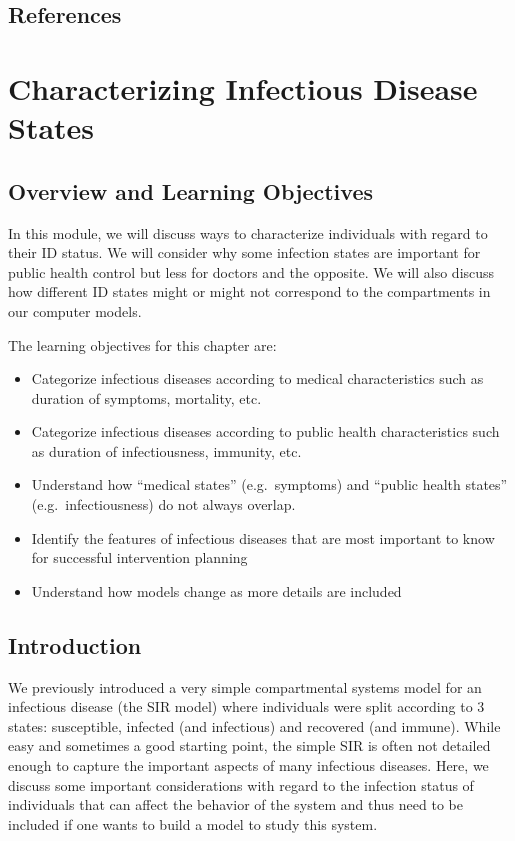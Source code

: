 \documentclass[]{book}
\providecommand{\tightlist}{%
  \setlength{\itemsep}{0pt}\setlength{\parskip}{0pt}}
\theoremstyle{definition}
\theoremstyle{definition}
\theoremstyle{definition}
\theoremstyle{remark}
\begin{document}
\section{References}\label{references-1}

\chapter{Characterizing Infectious Disease
States}\label{characterizing-infectious-disease-states}

\section{Overview and Learning
Objectives}\label{overview-and-learning-objectives-1}

In this module, we will discuss ways to characterize individuals with
regard to their ID status. We will consider why some infection states
are important for public health control but less for doctors and the
opposite. We will also discuss how different ID states might or might
not correspond to the compartments in our computer models.

The learning objectives for this chapter are:

\begin{itemize}
\tightlist
\item
  Categorize infectious diseases according to medical characteristics
  such as duration of symptoms, mortality, etc.
\item
  Categorize infectious diseases according to public health
  characteristics such as duration of infectiousness, immunity, etc.
\item
  Understand how ``medical states'' (e.g.~symptoms) and ``public health
  states'' (e.g.~infectiousness) do not always overlap.
\item
  Identify the features of infectious diseases that are most important
  to know for successful intervention planning
\item
  Understand how models change as more details are included
\end{itemize}

\section{Introduction}\label{introduction-1}

We previously introduced a very simple compartmental systems model for
an infectious disease (the SIR model) where individuals were split
according to 3 states: susceptible, infected (and infectious) and
recovered (and immune). While easy and sometimes a good starting point,
the simple SIR is often not detailed enough to capture the important
aspects of many infectious diseases. Here, we discuss some important
considerations with regard to the infection status of individuals that
can affect the behavior of the system and thus need to be included if
one wants to build a model to study this system.
\end{document}
